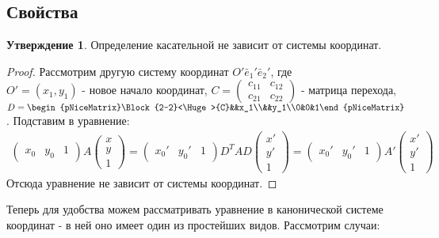 \documentclass[a4paper, 12pt]{article}
\theoremstyle{definition}
\newtheorem*{subtheorem}{Утверждение}
\begin{document}
	\subsection{Свойства}
	\begin{subtheorem}
		Определение касательной не зависит от системы координат.
	\end{subtheorem}
	\begin{proof}
		Рассмотрим другую систему координат $O'\bar{e}_{1}'\bar{e}_{2}'$, где \\$O' = (x_1, y_1)$ - новое начало координат, $C = \begin{pmatrix}c_{11}&c_{12}\\c_{21}&c_{22}\end{pmatrix}$ - матрица перехода, $D = \begin{pNiceMatrix}\Block{2-2}<\Huge>{C}&&x_1\\&&y_1\\0&0&1\end{pNiceMatrix}$. Подставим в уравнение:
		\begin{align*}
			\begin{pmatrix}  x_0 & y_0 & 1 \end{pmatrix} A \begin{pmatrix} x  \\ y \\ 1 \end{pmatrix} = \begin{pmatrix}  x_0' & y_0' & 1 \end{pmatrix}D^TAD\begin{pmatrix} x'  \\ y' \\ 1 \end{pmatrix} = \begin{pmatrix}  x_0' & y_0' & 1 \end{pmatrix} A' \begin{pmatrix} x'  \\ y' \\ 1 \end{pmatrix}
		\end{align*}
		Отсюда уравнение не зависит от системы координат.
	\end{proof}
	Теперь для удобства можем рассматривать уравнение в канонической системе координат - в ней оно имеет один из простейших видов. Рассмотрим случаи:
\end{document}

